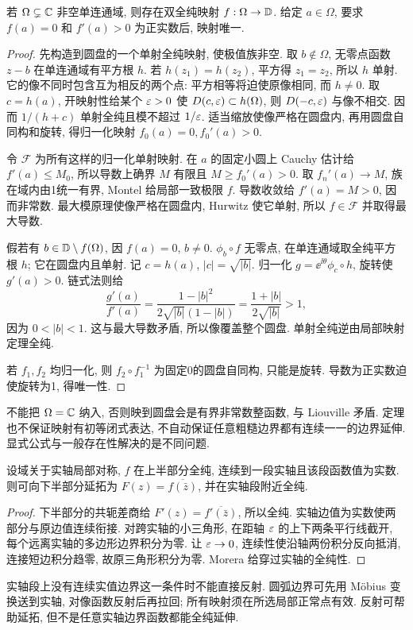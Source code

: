 \begin{theorem}[Riemann]\label{thm:riemann}
若 $\Omega\subsetneq\mathbb C$ 非空单连通域, 则存在双全纯映射 $f:\Omega\to\mathbb D$. 给定 $a\in\Omega$, 要求 $f(a)=0$ 和 $f'(a)>0$ 为正实数后, 映射唯一.
\end{theorem}
\begin{proof}
先构造到圆盘的一个单射全纯映射, 使极值族非空. 取 $b\notin\Omega$, 无零点函数 $z-b$ 在单连通域有平方根 $h$. 若 $h(z_1)=h(z_2)$, 平方得 $z_1=z_2$, 所以 $h$ 单射. 它的像不同时包含互为相反的两个点: 平方相等将迫使原像相同, 而 $h\ne0$. 取 $c=h(a)$, 开映射性给某个 $\varepsilon>0$ 使 $D(c,\varepsilon)\subset h(\Omega)$, 则 $D(-c,\varepsilon)$ 与像不相交. 因而 $1/(h+c)$ 单射全纯且模不超过 $1/\varepsilon$. 适当缩放使像严格在圆盘内, 再用圆盘自同构和旋转, 得归一化映射 $f_0(a)=0,f_0'(a)>0$.

令 $\mathcal F$ 为所有这样的归一化单射映射. 在 $a$ 的固定小圆上 Cauchy 估计给 $f'(a)\le M_0$, 所以导数上确界 $M$ 有限且 $M\ge f_0'(a)>0$. 取 $f_n'(a)\to M$, 族在域内由1统一有界, Montel 给局部一致极限 $f$. 导数收敛给 $f'(a)=M>0$, 因而非常数. 最大模原理使像严格在圆盘内, Hurwitz 使它单射, 所以 $f\in\mathcal F$ 并取得最大导数.

假若有 $b\in\mathbb D\setminus f(\Omega)$, 因 $f(a)=0$, $b\ne0$. $\phi_b\circ f$ 无零点, 在单连通域取全纯平方根 $h$; 它在圆盘内且单射. 记 $c=h(a)$, $|c|=\sqrt{|b|}$. 归一化 $g=\ee^{\ii\theta}\phi_c\circ h$, 旋转使 $g'(a)>0$. 链式法则给
\[
\frac{g'(a)}{f'(a)}=\frac{1-|b|^2}{2\sqrt{|b|}(1-|b|)}
 =\frac{1+|b|}{2\sqrt{|b|}}>1,
\]
因为 $0<|b|<1$. 这与最大导数矛盾, 所以像覆盖整个圆盘. 单射全纯逆由局部映射定理全纯.

若 $f_1,f_2$ 均归一化, 则 $f_2\circ f_1^{-1}$ 为固定0的圆盘自同构, 只能是旋转. 导数为正实数迫使旋转为1, 得唯一性.
\end{proof}
不能把 $\Omega=\mathbb C$ 纳入, 否则映到圆盘会是有界非常数整函数, 与 Liouville 矛盾. 定理也不保证映射有初等闭式表达, 不自动保证任意粗糙边界都有连续一一的边界延伸. 显式公式与一般存在性解决的是不同问题.

\begin{theorem}[直线反射原理]
设域关于实轴局部对称, $f$ 在上半部分全纯, 连续到一段实轴且该段函数值为实数. 则可向下半部分延拓为 $F(z)=\overline{f(\bar z)}$, 并在实轴段附近全纯.
\end{theorem}
\begin{proof}
下半部分的共轭差商给 $F'(z)=\overline{f'(\bar z)}$, 所以全纯. 实轴边值为实数使两部分与原边值连续衔接. 对跨实轴的小三角形, 在距轴 $\varepsilon$ 的上下两条平行线截开, 每个远离实轴的多边形边界积分为零. 让 $\varepsilon\to0$, 连续性使沿轴两份积分反向抵消, 连接短边积分趋零, 故原三角形积分为零. Morera 给穿过实轴的全纯性.
\end{proof}
实轴段上没有连续实值边界这一条件时不能直接反射. 圆弧边界可先用 Möbius 变换送到实轴, 对像函数反射后再拉回; 所有映射须在所选局部正常点有效. 反射可帮助延拓, 但不是任意实轴边界函数都能全纯延伸.

